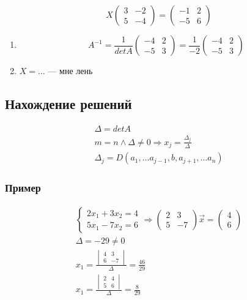 \documentclass{article}
\begin{document}
\[
X \begin{pmatrix}
	3 & -2 \\
	5 & -4
\end{pmatrix} =
\begin{pmatrix}
	-1 & 2 \\
	-5 & 6
\end{pmatrix}
\]

\begin{enumerate}
	\item \[
	A^{-1} = \frac{1}{det A} \begin{pmatrix}
		-4 & 2 \\
		-5 & 3
	\end{pmatrix} =
	\frac{1}{-2} \begin{pmatrix}
		-4 & 2 \\
		-5 & 3
	\end{pmatrix}
	\]
	\item $X = \dots$ --- мне лень
\end{enumerate}

\subsection{Нахождение решений}

\begin{gather*}
	\Delta = det A \\
	m = n \land \Delta \ne 0 \Rightarrow x_j = \frac{\Delta_j}{\Delta} \\
	\Delta_j = D(a_1, \dots a_{j-1}, b, a_{j+1}, \dots a_n)
\end{gather*}

\subsubsection*{Пример}

\begin{gather*}
	\begin{cases}
		2x_1 + 3x_2 = 4 \\
		5x_1 - 7x_2 = 6
	\end{cases} \Rightarrow
	\begin{pmatrix}
		2 & 3 \\
		5 & -7
	\end{pmatrix} \vec{x} =
	\begin{pmatrix}
		4 \\
		6
	\end{pmatrix} \\
	\Delta = -29 \ne 0 \\
	x_1 = \frac{\begin{vmatrix}
		4 & 3 \\
		6 & -7
	\end{vmatrix}}{\Delta} = \frac{46}{29} \\
	x_1 = \frac{\begin{vmatrix}
		2 & 4 \\
		5 & 6
	\end{vmatrix}}{\Delta} = \frac{8}{29}
\end{gather*}
\end{document}
